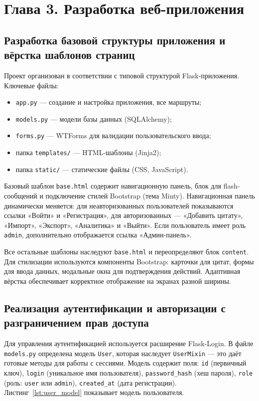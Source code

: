 \section*{Глава 3. Разработка веб-приложения}

\subsection{Разработка базовой структуры приложения и вёрстка шаблонов страниц}

Проект организован в соответствии с типовой структурой Flask-приложения. Ключевые файлы:

\begin{itemize}
    \item \texttt{app.py} — создание и настройка приложения, все маршруты;
    \item \texttt{models.py} — модели базы данных (SQLAlchemy);
    \item \texttt{forms.py} — WTForms для валидации пользовательского ввода;
    \item папка \texttt{templates/} — HTML-шаблоны (Jinja2);
    \item папка \texttt{static/} — статические файлы (CSS, JavaScript).
\end{itemize}

Базовый шаблон \texttt{base.html} содержит навигационную панель, блок для flash-сообщений и 
подключение стилей Bootstrap (тема Minty). Навигационная панель динамически меняется: для 
неавторизованных пользователей показываются ссылки «Войти» и «Регистрация», для авторизованных
 — «Добавить цитату», «Импорт», «Экспорт», «Аналитика» и «Выйти». Если пользователь имеет 
роль \texttt{admin}, дополнительно отображается ссылка «Админ-панель».

Все остальные шаблоны наследуют \texttt{base.html} и переопределяют блок \texttt{content}. 
Для стилизации используются компоненты Bootstrap: карточки для цитат, формы для ввода данных, 
модальные окна для подтверждения действий. Адаптивная вёрстка обеспечивает корректное 
отображение на экранах разной ширины.

\subsection{Реализация аутентификации и авторизации с разграничением прав доступа}

Для управления аутентификацией используется расширение Flask-Login. В файле \texttt{models.py} 
определена модель \texttt{User}, которая наследует \texttt{UserMixin} — это даёт готовые методы 
для работы с сессиями. Модель содержит поля: \texttt{id} (первичный ключ), \texttt{login} 
(уникальное имя пользователя), \texttt{password\_hash} (хеш пароля), \texttt{role} 
(роль: \texttt{user} или \texttt{admin}), \texttt{created\_at} (дата регистрации). 
Листинг~\ref{lst:user_model} показывает модель пользователя.


